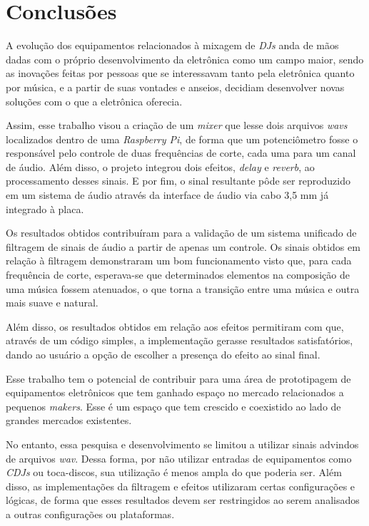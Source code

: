 \chapter[Conclusões]{Conclusões}

A evolução dos equipamentos relacionados à mixagem de \textit{DJs} anda de mãos dadas com o próprio desenvolvimento da eletrônica como um campo maior, sendo as inovações feitas por pessoas que se interessavam tanto pela eletrônica quanto por música, e a partir de suas vontades e anseios, decidiam desenvolver novas soluções com o que a eletrônica oferecia.

Assim, esse trabalho visou a criação de um \textit{mixer} que lesse dois arquivos \textit{wavs} localizados dentro de uma \textit{Raspberry Pi}, de forma que um potenciômetro fosse o responsável pelo controle de duas frequências de corte, cada uma para um canal de áudio. Além disso, o projeto integrou dois efeitos, \textit{delay} e \textit{reverb}, ao processamento desses sinais. E por fim, o sinal resultante pôde ser reproduzido em um sistema de áudio através da interface de áudio via cabo 3,5 mm já integrado à placa.

Os resultados obtidos contribuíram para a validação de um sistema unificado de filtragem de sinais de áudio a partir de apenas um controle. Os sinais obtidos em relação à filtragem demonstraram um bom funcionamento visto que, para cada frequência de corte, esperava-se que determinados elementos na composição de uma música fossem atenuados, o que torna a transição entre uma música e outra mais suave e natural.

Além disso, os resultados obtidos em relação aos efeitos permitiram com que, através de um código simples, a implementação gerasse resultados satisfatórios, dando ao usuário a opção de escolher a presença do efeito ao sinal final. 

Esse trabalho tem o potencial de contribuir para uma área de prototipagem de equipamentos eletrônicos que tem ganhado espaço no mercado relacionados a pequenos \textit{makers}. Esse é um espaço que tem crescido e coexistido ao lado de grandes mercados existentes.

No entanto, essa pesquisa e desenvolvimento se limitou a utilizar sinais advindos de arquivos \textit{wav}. Dessa forma, por não utilizar entradas de equipamentos como \textit{CDJs} ou toca-discos, sua utilização é menos ampla do que poderia ser. Além disso, as implementações da filtragem e efeitos utilizaram certas configurações e lógicas, de forma que esses resultados devem ser restringidos ao serem analisados a outras configurações ou plataformas.

